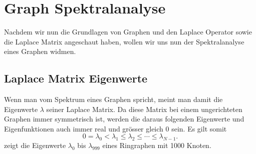 
\section{Graph Spektralanalyse\label{sec:sgwt:spectralanalysis}}

Nachdem wir nun die Grundlagen von Graphen und den Laplace Operator sowie die 
Laplace Matrix angeschaut haben, wollen wir uns nun der Spektralanalyse eines 
Graphen widmen.

\subsection{Laplace Matrix Eigenwerte}

Wenn man vom Spektrum eines Graphen spricht, meint man damit die Eigenwerte 
$\lambda$ seiner Laplace Matrix. Da diese Matrix bei einem ungerichteten 
Graphen immer symmetrisch ist, werden die daraus folgenden Eigenwerte und 
Eigenfunktionen auch immer real und gr\"osser gleich $0$ sein. Es gilt somit
\begin{equation}
0 = \lambda_0 < \lambda_1 \leq \lambda_2 \leq \cdots \leq \lambda_{N-1}.
\label{eq:sgwt:lambda:series}
\end{equation}
 zeigt die Eigenwerte $\lambda_0$ bis 
$\lambda_{999}$ eines Ringraphen mit 1000 Knoten.

